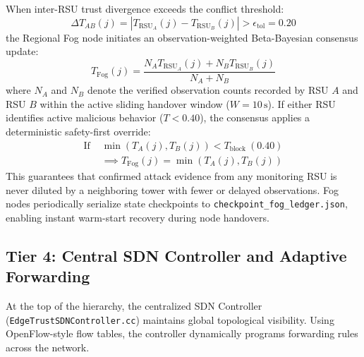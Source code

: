 \documentclass[conference]{IEEEtran}
\begin{document}
When inter-RSU trust divergence exceeds the conflict threshold:
\begin{equation}
\Delta T_{AB}(j) = |T_{\text{RSU}_A}(j) - T_{\text{RSU}_B}(j)| > \epsilon_{\text{tol}} = 0.20
\label{eq:divergence}
\end{equation}
the Regional Fog node initiates an observation-weighted Beta-Bayesian consensus update:
\begin{equation}
T_{\text{Fog}}(j) = \frac{N_A T_{\text{RSU}_A}(j) + N_B T_{\text{RSU}_B}(j)}{N_A + N_B}
\label{eq:fog_consensus}
\end{equation}
where $N_A$ and $N_B$ denote the verified observation counts recorded by RSU $A$ and RSU $B$ within the active sliding handover window ($W = 10\,\text{s}$). If either RSU identifies active malicious behavior ($T < 0.40$), the consensus applies a deterministic safety-first override:
\begin{equation}
\begin{split}
\text{If } &\min(T_A(j), T_B(j)) < T_{\text{block}} \ (0.40) \\
&\implies T_{\text{Fog}}(j) = \min(T_A(j), T_B(j))
\end{split}
\label{eq:safety_override}
\end{equation}
This guarantees that confirmed attack evidence from any monitoring RSU is never diluted by a neighboring tower with fewer or delayed observations. Fog nodes periodically serialize state checkpoints to \texttt{checkpoint\_fog\_ledger.json}, enabling instant warm-start recovery during node handovers.

\subsection{Tier 4: Central SDN Controller and Adaptive Forwarding}

At the top of the hierarchy, the centralized SDN Controller (\texttt{EdgeTrustSDNController.cc}) maintains global topological visibility. Using OpenFlow-style flow tables, the controller dynamically programs forwarding rules across the network.
\end{document}
